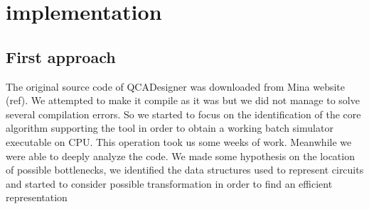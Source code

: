 \chapter{implementation}\label{sec:implementation}
\section{First approach}
The original source code of QCADesigner was downloaded from Mina website (ref). We attempted to make it compile as it was but we did not manage to solve several compilation errors. So we started to focus on the identification of the core algorithm supporting the tool in order to obtain a working batch simulator executable on CPU. This operation took us some weeks of work. Meanwhile we were able to deeply analyze the code. We made some hypothesis on the location of possible bottlenecks, we identified the data structures used to represent circuits and started to consider possible transformation in order to find an efficient representation 